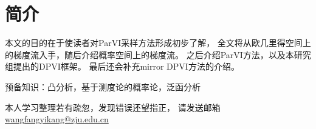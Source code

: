 \section{简介}

本文的目的在于使读者对ParVI采样方法形成初步了解，
全文将从欧几里得空间上的梯度流入手，随后介绍概率空间上的梯度流。
之后介绍ParVI方法，以及本研究组提出的DPVI框架。
最后还会补充mirror DPVI方法的介绍。
\par
预备知识：凸分析，基于测度论的概率论，泛函分析
\par
本人学习整理若有疏忽，发现错误还望指正，
请发送邮箱\href{wangfangyikang@zju.edu.cn}{wangfangyikang@zju.edu.cn}